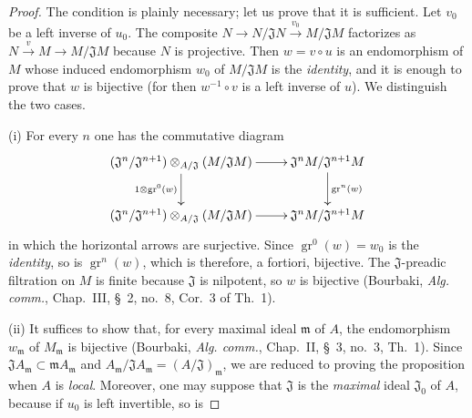 \begin{proof}
The condition is plainly necessary; let us prove that it is sufficient.
Let $v_0$ be a left inverse of $u_0$.
The composite $N\to N/\mathfrak JN\xrightarrow{v_0}M/\mathfrak JM$ factorizes as $N\xrightarrow{v}M\to M/\mathfrak JM$ because $N$ is projective.
Then $w=v\circ u$ is an endomorphism of $M$ whose induced endomorphism $w_0$ of $M/\mathfrak JM$ is the \emph{identity}, and it is enough to prove that $w$ is bijective (for then $w^{-1}\circ v$ is a left inverse of $u$).
We distinguish the two cases.

(i) For every $n$ one has the commutative diagram
\[
  \xymatrix{
    (\mathfrak J^n/\mathfrak J^{n+1})\otimes_{A/\mathfrak J}
      (M/\mathfrak JM)\ar[r]\ar[d]_{1\otimes\operatorname{gr}^0(w)} &
      \mathfrak J^nM/\mathfrak J^{n+1}M\ar[d]^{\operatorname{gr}^n(w)}\\
    (\mathfrak J^n/\mathfrak J^{n+1})\otimes_{A/\mathfrak J}
      (M/\mathfrak JM)\ar[r] & \mathfrak J^nM/\mathfrak J^{n+1}M
  }
\]
in which the horizontal arrows are surjective.
Since $\operatorname{gr}^0(w)=w_0$ is the \emph{identity}, so is $\operatorname{gr}^n(w)$, which is therefore, a fortiori, bijective.
The $\mathfrak J$-preadic filtration on $M$ is finite because $\mathfrak J$ is nilpotent, so $w$ is bijective (Bourbaki, \emph{Alg. comm.}, Chap.~III, \S~2, no.~8, Cor.~3 of Th.~1).

(ii) It suffices to show that, for every maximal ideal $\mathfrak m$ of $A$, the endomorphism $w_{\mathfrak m}$ of $M_{\mathfrak m}$ is bijective (Bourbaki, \emph{Alg. comm.}, Chap.~II, \S~3, no.~3, Th.~1).
Since $\mathfrak JA_{\mathfrak m}\subset\mathfrak mA_{\mathfrak m}$ and
$A_{\mathfrak m}/\mathfrak JA_{\mathfrak m}=(A/\mathfrak J)_{\mathfrak m}$, we are reduced to proving the proposition when $A$ is \emph{local}.
Moreover, one may suppose that $\mathfrak J$ is the \emph{maximal} ideal $\mathfrak J_0$ of $A$, because if $u_0$ is left invertible, so is



\end{proof}
